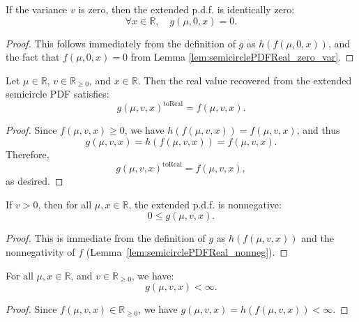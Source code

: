 \begin{lemma}
  \label{lem:semicirclePDF_zero_var}
  \mathlibok
  If the variance $v$ is zero, then the extended p.d.f. is identically zero:
 $$ 
    \forall x \in \mathbb{R}, \quad g(\mu,0,x) = 0.
 $$ 
\end{lemma}
\begin{proof}
  This follows immediately from the definition of $g$ as $h(f(\mu,0,x))$, and the fact that $f(\mu,0,x) = 0$ from Lemma \ref{lem:semicirclePDFReal_zero_var}.
\end{proof}

\begin{lemma}
    \label{lem:semicirclePDF_toReal}
Let \( \mu \in \mathbb{R} \), \( v \in \mathbb{R}_{\ge 0} \), and \( x \in \mathbb{R} \).
Then the real value recovered from the extended semicircle PDF satisfies:
\[
g(\mu, v, x)^{\operatorname{toReal}} = f(\mu, v, x).
\]
\end{lemma}
\begin{proof}
Since \( f(\mu, v, x) \ge 0 \), we have \( h(f(\mu, v, x)) = f(\mu, v, x) \), and thus
\[
g(\mu, v, x) = h(f(\mu, v, x)) = f(\mu, v, x).
\]
Therefore,
\[
g(\mu, v, x)^{\operatorname{toReal}} = f(\mu, v, x),
\]
as desired.
\end{proof}

\begin{lemma}
  \label{lem:semicirclePDF_nonneg}
  If $v > 0$, then for all $\mu, x \in \mathbb{R}$, the extended p.d.f. is nonnegative:
  \[
    0 \le g(\mu,v,x).
  \]
\end{lemma}
\begin{proof}
  This is immediate from the definition of $g$ as $h(f(\mu,v,x))$ and the nonnegativity of $f$ (Lemma~\ref{lem:semicirclePDFReal_nonneg}).
\end{proof}

\begin{lemma}
  \label{lem:semicirclePDF_finite}
  For all $\mu, x \in \mathbb{R}$, and $v \in \mathbb{R}_{\ge 0}$, we have:
    $$ 
    g(\mu,v,x) < \infty.
    $$ 
\end{lemma}
\begin{proof}
  Since $f(\mu,v,x) \in \mathbb{R}_{\ge 0}$, we have $g(\mu,v,x) = h(f(\mu,v,x)) < \infty$.
\end{proof}

